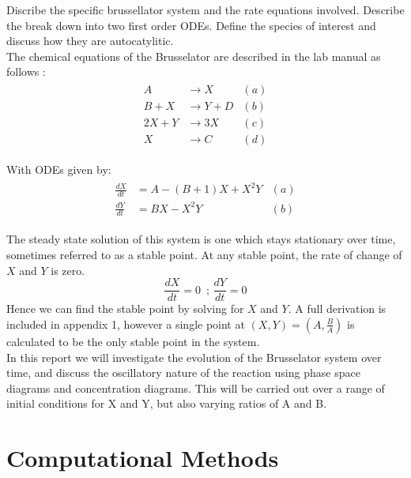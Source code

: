 \documentclass[reprint, amsmath, amssymb, aps]{revtex4-2}
\begin{document}
Discribe the specific brussellator system and the rate equations involved. Describe the break down into two first order ODEs. Define the species of interest and discuss how they are autocatylitic.\\

The chemical equations of the Brusselator are described in the lab manual as follows \cite{manual}:
\begin{align}
	\begin{aligned}
	A &\rightarrow X & (a)\\
	B + X &\rightarrow Y + D & (b)\\
	2X + Y &\rightarrow 3X & (c)\\
	X &\rightarrow C & (d)
	\end{aligned}
\end{align}

With ODEs given by:
\begin{align}
	\begin{aligned}
	\frac{dX}{dt} &= A - (B + 1)X + X^2 Y & (a)\\
	\frac{dY}{dt} &= BX - X^2 Y & (b)
	\end{aligned}
	\label{eq:rate}
\end{align}

The steady state solution of this system is one which stays stationary over time, sometimes referred to as a stable point. At any stable point, the rate of change of $X$ and $Y$ is zero.
\begin{equation}
	\frac{dX}{dt}=0\,\text{  ;  }\frac{dY}{dt}=0
\end{equation}Hence we can find the stable point by solving for $X$ and $Y$. A full derivation is included in appendix 1, however a single point at $(X, Y) = \left(A, \frac{B}{A}\right)$ is calculated to be the only stable point in the system.\\

In this report we will investigate the evolution of the Brusselator system over time, and discuss the oscillatory nature of the reaction using phase space diagrams and concentration diagrams. This will be carried out over a range of initial conditions for X and Y, but also varying ratios of A and B.

\section{Computational Methods}
\end{document}
